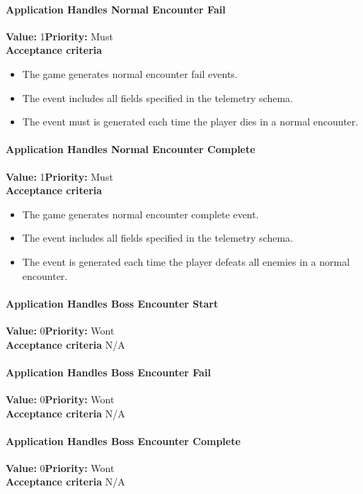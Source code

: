 \paragraph{Application Handles Normal Encounter Fail}
\textbf{Value:} 1\quad \textbf{Priority:} Must\\
\textbf{Acceptance criteria}
\begin{itemize}
  \item The game generates normal encounter fail events.
  \item The event includes all fields specified in the telemetry schema.
  \item The event must is generated each time the player dies in a normal encounter.
\end{itemize}

\paragraph{Application Handles Normal Encounter Complete}
\textbf{Value:} 1\quad \textbf{Priority:} Must\\
\textbf{Acceptance criteria}
\begin{itemize}
  \item The game generates normal encounter complete event.
  \item The event includes all fields specified in the telemetry schema.
  \item The event is generated each time the player defeats all enemies in a normal encounter.
\end{itemize}

\paragraph{Application Handles Boss Encounter Start}
\textbf{Value:} 0\quad \textbf{Priority:} Wont\\
\textbf{Acceptance criteria} N/A

\paragraph{Application Handles Boss Encounter Fail}
\textbf{Value:} 0\quad \textbf{Priority:} Wont\\
\textbf{Acceptance criteria} N/A

\paragraph{Application Handles Boss Encounter Complete}
\textbf{Value:} 0\quad \textbf{Priority:} Wont\\
\textbf{Acceptance criteria} N/A

